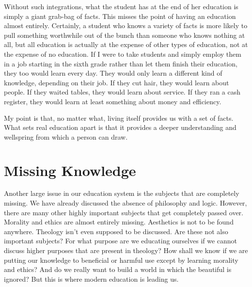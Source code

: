 Without such integrations, what the student has at the end of
her education is
simply a giant grab-bag of facts. This misses the point of having an
education almost entirely. Certainly, a student who knows a variety of
facts is more likely to pull something worthwhile out of
the bunch than
someone who knows nothing at all, but all education is actually at the
expense of other types of education, not at the expense of no
education. If I were to take students and simply employ them in a job
starting in the sixth grade rather than let them finish their
education, they too
would learn every
day. They would only learn a different kind of knowledge, depending on
their job. If they cut hair, they would learn about people. If they
waited tables, they would learn about service. If they ran a cash
register, they would learn at least something about money and
efficiency. 

My point is that, no matter what, living itself provides us with a set
of facts. What sets real education apart is that it provides a deeper
understanding and wellspring from which a person can draw.

\section{Missing Knowledge}

Another large issue in our education
system is the
subjects that are completely missing. We have already discussed the
absence of philosophy and logic. However, there are many other highly
important subjects that get completely passed over. Morality and ethics
are almost entirely missing. Aesthetics is not to be found anywhere.
Theology isn’t even supposed to be discussed. Are these not also
important subjects?  For what purpose are we educating ourselves if we
cannot discuss higher purposes that are present in theology?  How shall
we know if we are putting our knowledge to beneficial or harmful use
except by learning morality and ethics?  And do we really want to build
a world in which the beautiful is ignored?  But this is where modern
education is leading us.

